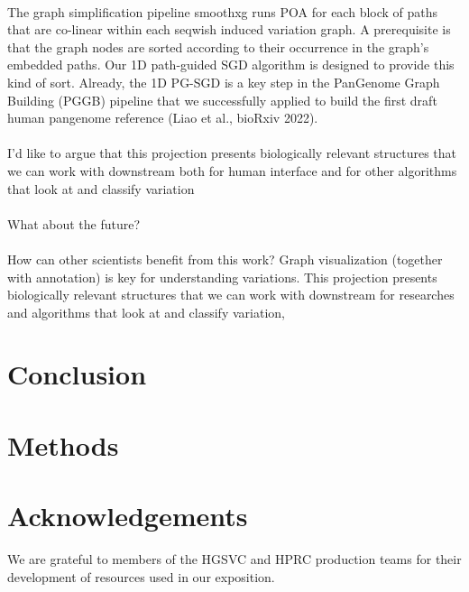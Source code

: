 \documentclass[11pt,hidelinks]{article}
\begin{document}
\paragraph{}
The graph simplification pipeline smoothxg runs POA for each block of paths that are co-linear within each seqwish induced variation graph.
A prerequisite is that the graph nodes are sorted according to their occurrence in the graph's embedded paths.
Our 1D path-guided SGD algorithm is designed to provide this kind of sort.
Already, the 1D PG-SGD is a key step in the PanGenome Graph Building (PGGB) pipeline that we successfully applied to build the first draft human pangenome reference (Liao et al., bioRxiv 2022).
\paragraph{}
I'd like to argue that this projection presents biologically relevant structures that we can work with downstream
both for human interface
and for other algorithms that look at and classify variation
\paragraph{}
What about the future?
\paragraph{}
How can other scientists benefit from this work?
Graph visualization (together with annotation) is key for understanding variations.
This projection presents biologically relevant structures that we can work with downstream for researches and algorithms that look at and classify variation,
\section{Conclusion}

\section{Methods}




\section*{Acknowledgements}
We are grateful to members of the HGSVC and HPRC production teams for their development of resources used in our exposition.
\end{document}
